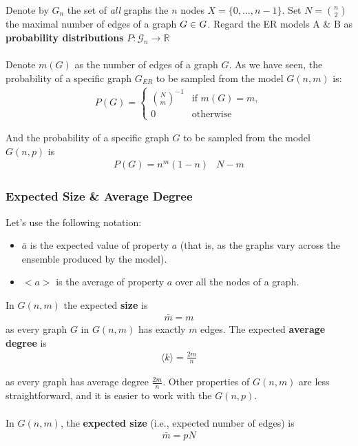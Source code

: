 \documentclass[a4paper,11pt]{article}
\begin{document}
Denote by $G_n$ the set of \textit{all} graphs the $n$ nodes $X=\{0, \dots, n-1\}$.
Set $N=\binom{n}{2}$ the maximal number of edges of a graph $G \in \textsl{G}$.
Regard the ER models A \& B as \textbf{probability distributions} $P : \mathcal{G}_n \rightarrow \mathbb{R}$
\\\\
Denote $m(G)$ as the number of edges of a graph $G$.
As we have seen, the probability of a specific graph $G_{ER}$ to be sampled from the model $G(n,m)$ is:
\begin{align*}
    P(G) = 
    \begin{cases}
        \binom{N}{m}^{-1} & \text{if } m(G)= m, \\
        0 & \text{otherwise}
    \end{cases}
\end{align*}

And the probability of a specific graph $G$ to be sampled from the model $G(n,p)$ is 
\begin{align*}
    P(G) = n^m(1-n)&{N-m}
\end{align*}

\subsubsection{Expected Size \& Average Degree}
Let's use the following notation:
\begin{itemize}
    \item   $\bar{a}$ is the expected value of property $a$ (that is, as the graphs vary across the ensemble produced by the model).
    \item   $<a>$ is the average of property $a$ over all the nodes of a graph.
\end{itemize}

In $G(n,m)$ the expected \textbf{size} is
\begin{align*}
    \bar{m} = m
\end{align*}
as every graph $G$ in $G(n,m)$ has exactly $m$ edges.
The expected \textbf{average degree} is
\begin{align*}
    \langle k \rangle = \frac{2m}{n}
\end{align*}

as every graph has average degree $\frac{2m}{n}$.
Other properties of $G(n,m)$ are less straightforward, and it is easier to work with the $G(n,p)$.
\\\\
In $G(n,m)$, the \textbf{expected size} (i.e.,  expected number of edges) is 
\begin{align*}
    \bar{m} = pN
\end{align*}
\end{document}
